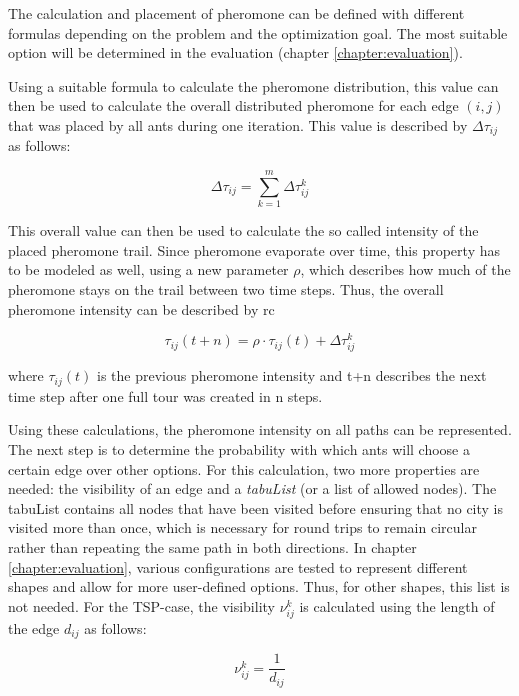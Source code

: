 The calculation and placement of pheromone can be defined with different formulas depending on the problem and the optimization goal. 
The most suitable option will be determined in the evaluation (chapter \ref{chapter:evaluation}).


Using a suitable formula to calculate the pheromone distribution, this value can then be used to calculate the overall distributed pheromone for each edge $(i,j)$ that was placed by all ants during one iteration.
This value is described by $\Delta\tau_{ij}$ as follows:

\begin{equation}\label{eq:deltaTau}
	\Delta\tau_{ij} = \sum_{k=1}^{m} \Delta\tau_{ij}^k 
\end{equation}

This overall value can then be used to calculate the so called \glqq intensity\grqq{} of the placed pheromone trail.
Since pheromone evaporate over time, this property has to be modeled as well, using a new parameter $\rho$, which describes how much of the pheromone stays on the trail between two time steps.
Thus, the overall pheromone intensity can be described by
rc

\begin{equation}\label{eq:trailIntensity}
	\tau_{ij}(t+n) = \rho \cdot \tau_{ij}(t)+\Delta\tau_{ij}^k 
\end{equation}

where $\tau_{ij}(t)$ is the previous pheromone intensity and t+n describes the next time step after one full tour was created in n steps.

Using these calculations, the pheromone intensity on all paths can be represented. 
The next step is to determine the probability with which ants will choose a certain edge over other options.
For this calculation, two more properties are needed: the visibility of an edge and a \textit{tabuList} (or a list of allowed nodes).
The tabuList contains all nodes that have been visited before ensuring that no city is visited more than once, which is necessary for round trips to remain circular rather than repeating the same path in both directions.
In chapter \ref{chapter:evaluation}, various configurations are tested to represent different shapes and allow for more  user-defined options. 
Thus, for other shapes, this list is not needed.
For the TSP-case, the visibility $\nu_{ij}^k$ is calculated using the length of the edge $d_{ij}$ as follows:

\begin{equation}\label{eq:visibility}
	\nu_{ij}^k = \frac{1}{d_{ij}}
\end{equation}

